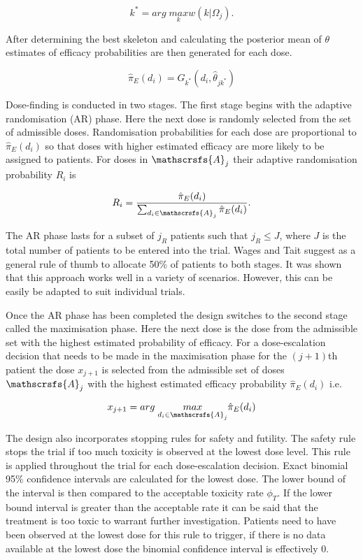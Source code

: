 \begin{equation}
k^* = arg \; \underset{k}{max}w(k|\Omega_j).
\end{equation}

After determining the best skeleton and calculating the posterior mean of $\theta$ estimates of efficacy probabilities are then generated for each dose. 

\begin{equation}
\hat{\pi}_E(d_i) = G_{k^*} (d_i, \hat{\theta}_{jk^*})
\end{equation}

Dose-finding is conducted in two stages. The first stage begins with the adaptive randomisation (AR) phase. Here the next dose is randomly selected from the set of admissible doses. Randomisation probabilities for each dose are proportional to $\hat{\pi}_E(d_i)$ so that doses with higher estimated efficacy are more likely to be assigned to patients. For doses in $\mathscrsfs{A}_j$ their adaptive randomisation probability $R_i$ is 

\begin{equation}
\label{WT:eq_WT-ARprob}
R_i = \frac{\hat{\pi}_E(d_i)}{\sum_{d_i \in \mathscrsfs{A}_j}\hat{\pi}_E(d_i)}. 
\end{equation}

The AR phase lasts for a subset of $j_R$ patients such that $j_R \leq J$, where $J$ is the total number of patients to be entered into the trial. Wages and Tait suggest as a general rule of thumb to allocate 50\% of patients to both stages. It was shown that this approach works well in a variety of scenarios. However, this can be easily be adapted to suit individual trials. 

Once the AR phase has been completed the design switches to the second stage called the maximisation phase. Here the next dose is the dose from the admissible set with the highest estimated probability of efficacy. For a dose-escalation decision that needs to be made in the maximisation phase for the $(j+1)$th patient the dose $x_{j+1}$ is selected from the admissible set of doses $\mathscrsfs{A}_j$ with the highest estimated efficacy probability $\hat{\pi}_E(d_i)$ i.e. 

\begin{equation}
x_{j+1} = arg \; \underset{d_i \in \mathscrsfs{A}_j}{max}\hat{\pi}_E(d_i)
\end{equation}

The design also incorporates stopping rules for safety and futility. The safety rule stops the trial if too much toxicity is observed at the lowest dose level. This rule is applied throughout the trial for each dose-escalation decision. Exact binomial 95\% confidence intervals are calculated for the lowest dose. The lower bound of the interval is then compared to the acceptable toxicity rate $\phi_T$. If the lower bound interval is greater than the acceptable rate it can be said that the treatment is too toxic to warrant further investigation. Patients need to have been observed at the lowest dose for this rule to trigger, if there is no data available at the lowest dose the binomial confidence interval is effectively 0. 

